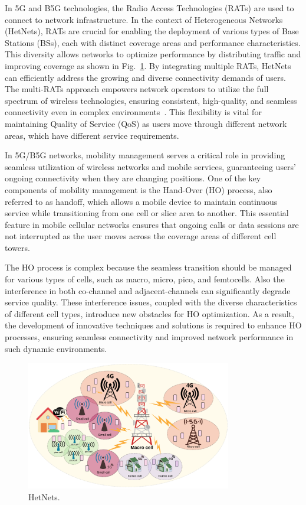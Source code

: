 \documentclass[graybox]{svmult}
\begin{document}
In 5G and B5G technologies, the Radio Access Technologies (RATs) are used to connect to network infrastructure. In the context of Heterogeneous Networks (HetNets), RATs are crucial for enabling the deployment of various types of Base Stations (BSs), each with distinct coverage areas and performance characteristics. This diversity allows networks to optimize performance by distributing traffic and improving coverage as shown in Fig.~\ref{fig:hetnets}. By integrating multiple RATs, HetNets can efficiently address the growing and diverse connectivity demands of users. The multi-RATs approach empowers network operators to utilize the full spectrum of wireless technologies, ensuring consistent, high-quality, and seamless connectivity even in complex environments~\cite{ullah2023survey}. This flexibility is vital for maintaining Quality of Service (QoS) as users move through different network areas, which have different service requirements.

In 5G/B5G networks, mobility management serves a critical role in providing seamless utilization of wireless networks and mobile services, guaranteeing users' ongoing connectivity when they are changing positions. One of the key components of mobility management is the Hand-Over (HO) process, also referred to as handoff, which allows a mobile device to maintain continuous service while transitioning from one cell or slice area to another. This essential feature in mobile cellular networks ensures that ongoing calls or data sessions are not interrupted as the user moves across the coverage areas of different cell towers.

The HO process is complex because the seamless transition should be managed for  various types of cells, such as macro, micro, pico, and femtocells. Also the interference in both co-channel and adjacent-channels can significantly degrade service quality. These interference issues, coupled with the diverse characteristics of different cell types, introduce new obstacles for HO optimization. As a result, the development of innovative techniques and solutions is required to enhance HO processes, ensuring seamless connectivity and improved network performance in such dynamic environments.

\begin{figure}[h]\centering
	\includegraphics[width=0.8\textwidth]{figure/hetnets.png}
	\caption{HetNets.}\label{fig:hetnets}
\end{figure}
\end{document}
